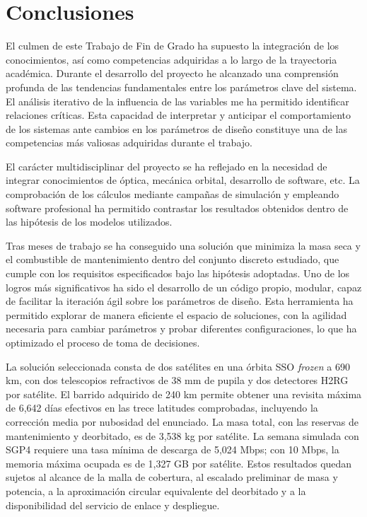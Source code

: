 \chapter{Conclusiones}
El culmen de este Trabajo de Fin de Grado ha supuesto la integración de los conocimientos, así como competencias adquiridas a lo largo de la trayectoria académica. Durante el desarrollo del proyecto he alcanzado una comprensión profunda de las tendencias fundamentales entre los parámetros clave del sistema. El análisis iterativo de la influencia de las variables me ha permitido identificar relaciones críticas. Esta capacidad de interpretar y anticipar el comportamiento de los sistemas ante cambios en los parámetros de diseño constituye una de las competencias más valiosas adquiridas durante el trabajo.


El carácter multidisciplinar del proyecto se ha reflejado en la necesidad de integrar conocimientos de óptica, mecánica orbital, desarrollo de software, etc. La comprobación de los cálculos mediante campañas de simulación y empleando software profesional ha permitido contrastar los resultados obtenidos dentro de las hipótesis de los modelos utilizados.

Tras meses de trabajo se ha conseguido una solución que minimiza la masa seca y el combustible de mantenimiento dentro del conjunto discreto estudiado, que cumple con los requisitos especificados bajo las hipótesis adoptadas. Uno de los logros más significativos ha sido el desarrollo de un código propio, modular, capaz de facilitar la iteración ágil sobre los parámetros de diseño. Esta herramienta ha permitido explorar de manera eficiente el espacio de soluciones, con la agilidad necesaria para cambiar parámetros y probar diferentes configuraciones, lo que ha optimizado el proceso de toma de decisiones.

La solución seleccionada consta de dos satélites en una órbita SSO \textit{frozen} a 690 km, con dos telescopios refractivos de 38 mm de pupila y dos detectores H2RG por satélite. El barrido adquirido de 240 km permite obtener una revisita máxima de 6,642 días efectivos en las trece latitudes comprobadas, incluyendo la corrección media por nubosidad del enunciado. La masa total, con las reservas de mantenimiento y deorbitado, es de 3,538 kg por satélite. La semana simulada con SGP4 requiere una tasa mínima de descarga de 5,024 Mbps; con 10 Mbps, la memoria máxima ocupada es de 1,327 GB por satélite. Estos resultados quedan sujetos al alcance de la malla de cobertura, al escalado preliminar de masa y potencia, a la aproximación circular equivalente del deorbitado y a la disponibilidad del servicio de enlace y despliegue.


